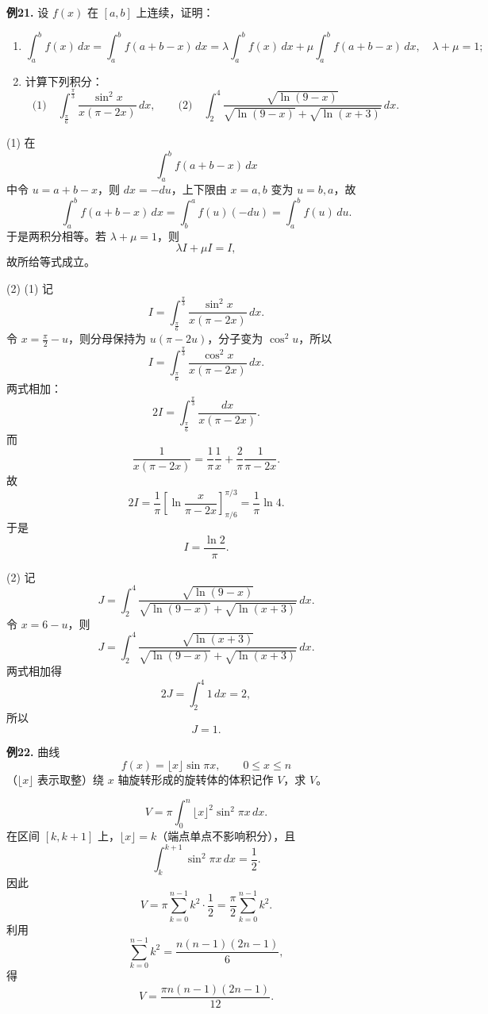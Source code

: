 \begin{problemblock}
\textbf{例21.} 设 \(f(x)\) 在 \([a,b]\) 上连续，证明：
\begin{enumerate}[label=(\arabic*), leftmargin=2.2em]
\item
\[
\int_a^b f(x)\,dx=\int_a^b f(a+b-x)\,dx
=\lambda\int_a^b f(x)\,dx+\mu\int_a^b f(a+b-x)\,dx,
\quad \lambda+\mu=1;
\]
\item 计算下列积分：
\[
\text{(1)}\quad
\int_{\frac\pi6}^{\frac\pi3}
\frac{\sin^2x}{x(\pi-2x)}\,dx,
\qquad
\text{(2)}\quad
\int_2^4
\frac{\sqrt{\ln(9-x)}}{\sqrt{\ln(9-x)}+\sqrt{\ln(x+3)}}\,dx.
\]
\end{enumerate}
\end{problemblock}
\begin{solutionblock}
(1) 在
\[
\int_a^b f(a+b-x)\,dx
\]
中令 \(u=a+b-x\)，则 \(dx=-du\)，上下限由 \(x=a,b\) 变为 \(u=b,a\)，故
\[
\int_a^b f(a+b-x)\,dx
=\int_b^a f(u)(-du)=\int_a^b f(u)\,du.
\]
于是两积分相等。若 \(\lambda+\mu=1\)，则
\[
\lambda I+\mu I=I,
\]
故所给等式成立。

(2) (1) 记
\[
I=\int_{\frac\pi6}^{\frac\pi3}
\frac{\sin^2x}{x(\pi-2x)}\,dx.
\]
令 \(x=\frac\pi2-u\)，则分母保持为 \(u(\pi-2u)\)，分子变为 \(\cos^2u\)，所以
\[
I=\int_{\frac\pi6}^{\frac\pi3}
\frac{\cos^2x}{x(\pi-2x)}\,dx.
\]
两式相加：
\[
2I=\int_{\frac\pi6}^{\frac\pi3}\frac{dx}{x(\pi-2x)}.
\]
而
\[
\frac1{x(\pi-2x)}
=\frac1\pi\frac1x+\frac2\pi\frac1{\pi-2x}.
\]
故
\[
2I=\frac1\pi
\left[\ln\frac{x}{\pi-2x}\right]_{\pi/6}^{\pi/3}
=\frac1\pi\ln4.
\]
于是
\[
I=\frac{\ln2}{\pi}.
\]

(2) 记
\[
J=\int_2^4
\frac{\sqrt{\ln(9-x)}}{\sqrt{\ln(9-x)}+\sqrt{\ln(x+3)}}\,dx.
\]
令 \(x=6-u\)，则
\[
J=\int_2^4
\frac{\sqrt{\ln(x+3)}}{\sqrt{\ln(9-x)}+\sqrt{\ln(x+3)}}\,dx.
\]
两式相加得
\[
2J=\int_2^4 1\,dx=2,
\]
所以
\[
J=1.
\]
\end{solutionblock}

\begin{problemblock}
\textbf{例22.} 曲线
\[
f(x)=\lfloor x\rfloor\sin\pi x,\qquad 0\le x\le n
\]
（\(\lfloor x\rfloor\) 表示取整）绕 \(x\) 轴旋转形成的旋转体的体积记作 \(V\)，求 \(V\)。
\end{problemblock}
\begin{solutionblock}
\analysis{绕 \(x\) 轴旋转体体积为 \(V=\pi\int y^2\,dx\)。取整函数在每个 \([k,k+1)\) 上为常数 \(k\)。}
\[
V=\pi\int_0^n \lfloor x\rfloor^2\sin^2\pi x\,dx.
\]
在区间 \([k,k+1]\) 上，\(\lfloor x\rfloor=k\)（端点单点不影响积分），且
\[
\int_k^{k+1}\sin^2\pi x\,dx=\frac12.
\]
因此
\[
V=\pi\sum_{k=0}^{n-1}k^2\cdot\frac12
=\frac\pi2\sum_{k=0}^{n-1}k^2.
\]
利用
\[
\sum_{k=0}^{n-1}k^2=\frac{n(n-1)(2n-1)}6,
\]
得
\[
V=\frac{\pi n(n-1)(2n-1)}{12}.
\]
\end{solutionblock}

